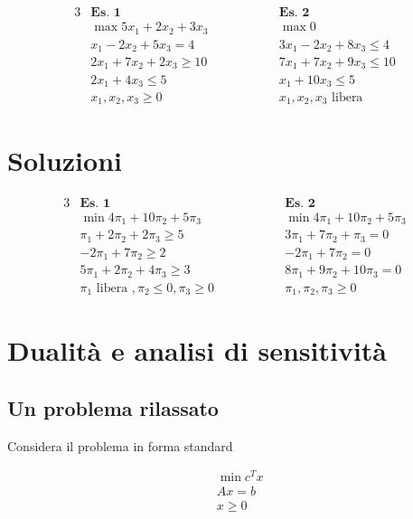 \documentclass[a4paper, 11pt]{article}
\begin{document}
        \begin{alignat*}{3}
            &\textbf{Es. 1} &\qquad\qquad &\textbf{Es. 2} \\
            &\max 5x_1 + 2x_2 + 3x_3 &\qquad\qquad &\max 0 \\
            &x_1 - 2x_2 + 5x_3 = 4 &\qquad\qquad &3x_1 - 2x_2 + 8x_3 \leq 4 \\
            &2x_1 + 7x_2 + 2x_3 \geq 10 &\qquad\qquad &7x_1 + 7x_2 + 9x_3 \leq 10 \\
            &2x_1 + 4x_3 \leq 5 &\qquad\qquad &x_1 + 10x_3 \leq 5 \\
            &x_1, x_2, x_3 \geq 0 &\qquad\qquad &x_1, x_2, x_3 \text{ libera }
        \end{alignat*}
        
        \section*{Soluzioni}
        
        \begin{alignat*}{3}
            &\textbf{Es. 1} &\qquad\qquad &\textbf{Es. 2} \\
            &\min 4\pi_1 + 10\pi_2 + 5\pi_3 &\qquad\qquad &\min 4\pi_1 + 10\pi_2 + 5\pi_3\\
            &\pi_1 + 2\pi_2 + 2\pi_3 \geq 5 &\qquad\qquad &3\pi_1 + 7\pi_2 + \pi_3 = 0\\
            &-2\pi_1 + 7\pi_2 \geq 2 &\qquad\qquad &-2\pi_1 + 7\pi_2 = 0 \\
            &5\pi_1 + 2\pi_2 + 4\pi_3 \geq 3 &\qquad\qquad &8\pi_1 + 9\pi_2 + 10\pi_3 = 0\\
            &\pi_1 \text{ libera }, \pi_2 \leq 0, \pi_3 \geq 0 &\qquad\qquad &\pi_1, \pi_2, \pi_3 \geq 0
        \end{alignat*}


    \section{Dualità e analisi di sensitività}

        \subsection{Un problema rilassato}
        Considera il problema in forma standard

        \begin{align*}
            &\min c^T x \\
            & Ax = b \\
            & x \geq 0
        \end{align*}
\end{document}
